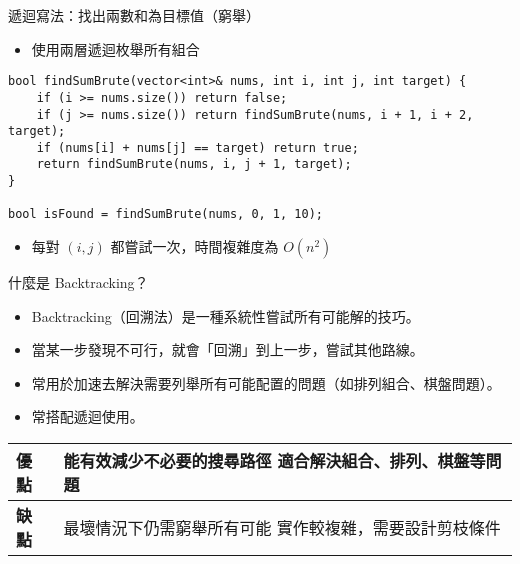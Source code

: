 \documentclass{beamer}
\begin{document}
\begin{frame}[fragile]{遞迴寫法：找出兩數和為目標值（窮舉）}
\begin{itemize}
    \item 使用兩層遞迴枚舉所有組合
\end{itemize}

\vspace{0.5em}
\begin{lstlisting}[style=cppstyle]
bool findSumBrute(vector<int>& nums, int i, int j, int target) {
    if (i >= nums.size()) return false;
    if (j >= nums.size()) return findSumBrute(nums, i + 1, i + 2, target);
    if (nums[i] + nums[j] == target) return true;
    return findSumBrute(nums, i, j + 1, target);
}

bool isFound = findSumBrute(nums, 0, 1, 10);
\end{lstlisting}

\vspace{0.5em}
\begin{itemize}
    \item 每對 $(i, j)$ 都嘗試一次，時間複雜度為 $O(n^2)$
\end{itemize}
\end{frame}

\begin{frame}{什麼是 Backtracking？}
\begin{itemize}
    \item Backtracking（回溯法）是一種系統性嘗試所有可能解的技巧。
    \item 當某一步發現不可行，就會「回溯」到上一步，嘗試其他路線。
    \item 常用於加速去解決需要列舉所有可能配置的問題（如排列組合、棋盤問題）。
    \item 常搭配遞迴使用。
\end{itemize}

\vspace{1em}

\begin{center}
\renewcommand{\arraystretch}{1.3}
\begin{tabular}{|>{\centering\arraybackslash}m{3cm}|>{\raggedright\arraybackslash}m{6.5cm}|}
\hline
\textbf{優點} &
能有效減少不必要的搜尋路徑 \newline
適合解決組合、排列、棋盤等問題 \\
\hline
\textbf{缺點} &
最壞情況下仍需窮舉所有可能 \newline
實作較複雜，需要設計剪枝條件 \\
\hline
\end{tabular}
\end{center}
\end{frame}
\end{document}

